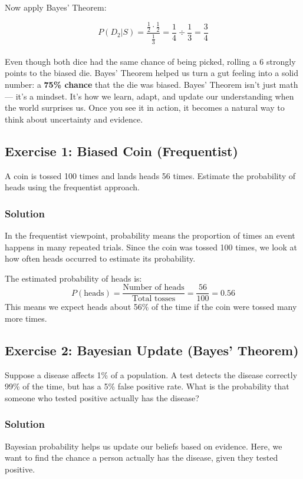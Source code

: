 \documentclass{book}
\begin{document}
Now apply Bayes' Theorem:

\[
P(D_2 | S) = \frac{\frac{1}{2} \cdot \frac{1}{2}}{\frac{1}{3}} = \frac{1}{4} \div \frac{1}{3} = \frac{3}{4}
\]\\

Even though both dice had the same chance of being picked, rolling a 6 strongly points to the biased die. Bayes’ Theorem helped us turn a gut feeling into a solid number: a \textbf{75\% chance} that the die was biased. Bayes’ Theorem isn’t just math — it’s a mindset. It’s how we learn, adapt, and update our understanding when the world surprises us. Once you see it in action, it becomes a natural way to think about uncertainty and evidence.

\newpage

\subsection*{Exercise 1: Biased Coin (Frequentist)}
A coin is tossed 100 times and lands heads 56 times. Estimate the probability of heads using the frequentist approach.

\subsubsection*{Solution}
In the frequentist viewpoint, probability means the proportion of times an event happens in many repeated trials. Since the coin was tossed 100 times, we look at how often heads occurred to estimate its probability.

The estimated probability of heads is:
\[
P(\text{heads}) = \frac{\text{Number of heads}}{\text{Total tosses}} = \frac{56}{100} = 0.56
\]
This means we expect heads about 56\% of the time if the coin were tossed many more times.

\subsection*{Exercise 2: Bayesian Update (Bayes' Theorem)}
Suppose a disease affects 1\% of a population. A test detects the disease correctly 99\% of the time, but has a 5\% false positive rate. What is the probability that someone who tested positive actually has the disease?

\subsubsection*{Solution}
Bayesian probability helps us update our beliefs based on evidence. Here, we want to find the chance a person actually has the disease, given they tested positive.
\end{document}
